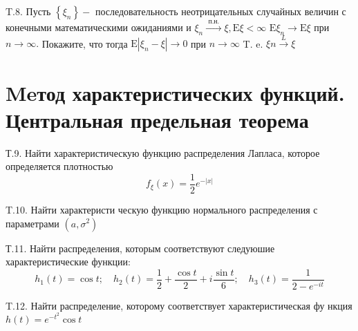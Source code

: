\documentclass[a4paper,12pt]{article} %
\begin{document}
\begin{example}


T.8. Пусть $\left\{\xi_{n}\right\}-$ последовательность неотрицательных случайных величин с конечными математическими ожиданиями и $\xi_{n} \stackrel{\text { п.н. }}{\rightarrow} \xi, \mathrm{E} \xi<\infty$ $\mathrm{E} \xi_{n} \rightarrow \mathrm{E} \xi$ при $n \rightarrow \infty .$ Покажите, что тогда $\mathrm{E}\left|\xi_{n}-\xi\right| \rightarrow 0$ при $n \rightarrow \infty$
T. e. $\xi n \stackrel{L}{\rightarrow} \xi$



\end{example}



\section{Meтод характеристических функций. Центральная предельная теорема}



\begin{example}


Т.9. Найти характеристическую функцию распределения Лапласа, которое определяется плотностью
$$
f_{\xi}(x)=\frac{1}{2} e^{-|x|}
$$





\end{example}



\begin{example}

T.10. Найти характеристи ческую функцию нормального распределения с параметрами $\left(a, \sigma^{2}\right)$




\end{example}



\begin{example}

Т.11. Найти распределения, которым соответствуют следуюшие характеристические функции:
$$
h_{1}(t)=\cos t ; \quad h_{2}(t)=\frac{1}{2}+\frac{\cos t}{2}+i \frac{\sin t}{6} ; \quad h_{3}(t)=\frac{1}{2-e^{-i t}}
$$




\end{example}





\begin{example}


T.12. Найти распределение, которому соответствует характеристическая фу нкция $h(t)=e^{-t^{2}} \cos t$



\end{example}
\end{document}
